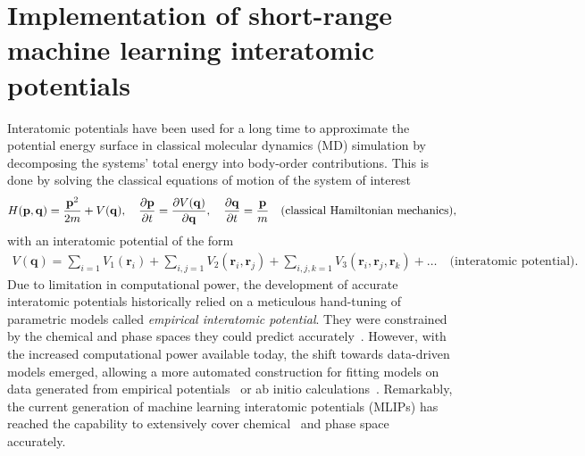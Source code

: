 \chapter{Implementation of short-range machine learning interatomic potentials}

Interatomic potentials have been used for a long time to approximate the potential energy surface in classical molecular dynamics (MD) simulation by decomposing the systems' total energy into body-order contributions.
This is done by solving the classical equations of motion of the system of interest
\begin{subequations}
\begin{align}
  H(\mathbf{p}, \mathbf{q}) = \frac{\mathbf{p}^2}{2m} + V(\mathbf{q}),\quad
  \frac{\partial\mathbf{p}}{\partial t} = \frac{\partial V(\mathbf{q})}{\partial\mathbf{q}},\quad\frac{\partial\mathbf{q}}{\partial t} = \frac{\mathbf{p}}{m}\quad\textrm{(classical Hamiltonian mechanics)},
\end{align}\\
\end{subequations}
with an interatomic potential of the form
\begin{subequations}
\begin{gather}
  V(\mathbf{q}) = \sum_{i = 1} V_1(\mathbf{r}_i) + \sum_{i,j = 1} V_2(\mathbf{r}_i, \mathbf{r}_j) + \sum_{i,j,k = 1} V_3(\mathbf{r}_i, \mathbf{r}_j, \mathbf{r}_k) + \ldots \quad\textrm{(interatomic potential)}.
\end{gather}
\end{subequations}
Due to limitation in computational power, the development of accurate interatomic potentials historically relied on a meticulous hand-tuning of parametric models called \emph{empirical interatomic potential}.
They were constrained by the chemical and phase spaces they could predict accurately~\cite{stillinger1985computer, tersoff1988empirical}.
However, with the increased computational power available today, the shift towards data-driven models emerged, allowing a more automated construction for fitting models on data generated from empirical potentials~\cite{blank1995neural} or ab initio calculations~\cite{brown2003classical,lorenz2006descriptions,behl-parr07prl}.
Remarkably, the current generation of machine learning interatomic potentials (MLIPs) has reached the capability to extensively cover chemical~\cite{lopanitsyna2023modeling} and phase space~\cite{bartok2018machine} accurately.

